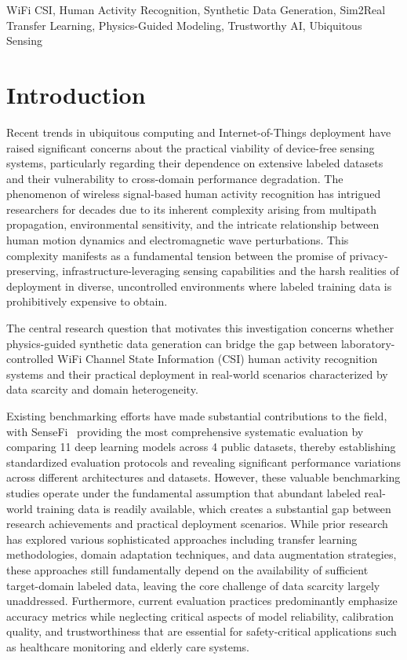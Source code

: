 \documentclass[journal]{IEEEtran}
\begin{document}
\begin{IEEEkeywords}
WiFi CSI, Human Activity Recognition, Synthetic Data Generation, Sim2Real Transfer Learning, Physics-Guided Modeling, Trustworthy AI, Ubiquitous Sensing
\end{IEEEkeywords}

\section{Introduction}

Recent trends in ubiquitous computing and Internet-of-Things deployment have raised significant concerns about the practical viability of device-free sensing systems, particularly regarding their dependence on extensive labeled datasets and their vulnerability to cross-domain performance degradation. The phenomenon of wireless signal-based human activity recognition has intrigued researchers for decades due to its inherent complexity arising from multipath propagation, environmental sensitivity, and the intricate relationship between human motion dynamics and electromagnetic wave perturbations. This complexity manifests as a fundamental tension between the promise of privacy-preserving, infrastructure-leveraging sensing capabilities and the harsh realities of deployment in diverse, uncontrolled environments where labeled training data is prohibitively expensive to obtain.

The central research question that motivates this investigation concerns whether physics-guided synthetic data generation can bridge the gap between laboratory-controlled WiFi Channel State Information (CSI) human activity recognition systems and their practical deployment in real-world scenarios characterized by data scarcity and domain heterogeneity.

Existing benchmarking efforts have made substantial contributions to the field, with SenseFi~\cite{yang2023sensefi} providing the most comprehensive systematic evaluation by comparing 11 deep learning models across 4 public datasets, thereby establishing standardized evaluation protocols and revealing significant performance variations across different architectures and datasets. However, these valuable benchmarking studies operate under the fundamental assumption that abundant labeled real-world training data is readily available, which creates a substantial gap between research achievements and practical deployment scenarios. While prior research has explored various sophisticated approaches including transfer learning methodologies, domain adaptation techniques, and data augmentation strategies, these approaches still fundamentally depend on the availability of sufficient target-domain labeled data, leaving the core challenge of data scarcity largely unaddressed. Furthermore, current evaluation practices predominantly emphasize accuracy metrics while neglecting critical aspects of model reliability, calibration quality, and trustworthiness that are essential for safety-critical applications such as healthcare monitoring and elderly care systems.
\end{document}
